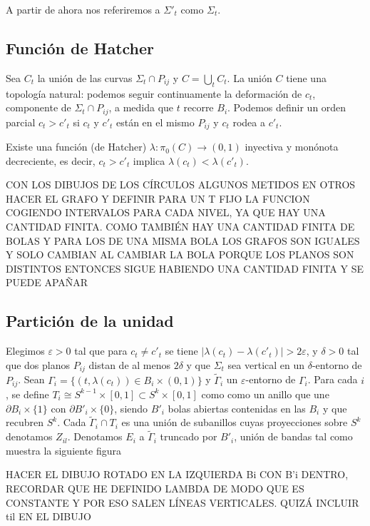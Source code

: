 \documentclass[twoside, 11pt]{article}
\begin{document}
A partir de ahora nos referiremos a $\Sigma'_t$ como $\Sigma_t$. 

\subsection{Función de Hatcher}
Sea $C_t$ la unión de las curvas $\Sigma_t\cap P_{ij}$ y $C=\bigcup_t C_t$. La unión $C$ tiene una topología natural: podemos seguir continuamente la deformación de $c_t$, componente de $\Sigma_t\cap P_{ij}$, a medida que $t$ recorre $B_i$. Podemos definir un orden parcial $c_t>c'_t$ si $c_t$ y $c'_t$ están en el mismo $P_{ij}$ y $c_t$ rodea a $c'_t$. 

\begin{prop}
Existe una función (de Hatcher) $\lambda:\pi_0(C)\to (0,1)$ inyectiva y monónota decreciente, es decir, $c_t>c'_t$ implica $\lambda(c_t)<\lambda(c'_t)$.
\end{prop}
\begin{dem}
CON LOS DIBUJOS DE LOS CÍRCULOS ALGUNOS METIDOS EN OTROS HACER EL GRAFO Y DEFINIR PARA UN T FIJO LA FUNCION COGIENDO INTERVALOS PARA CADA NIVEL, YA QUE HAY UNA CANTIDAD FINITA. COMO TAMBIÉN HAY UNA CANTIDAD FINITA DE BOLAS Y PARA LOS DE UNA MISMA BOLA LOS GRAFOS SON IGUALES Y SOLO CAMBIAN AL CAMBIAR LA BOLA PORQUE LOS PLANOS SON DISTINTOS ENTONCES SIGUE HABIENDO UNA CANTIDAD FINITA Y SE PUEDE APAÑAR
\QED
\end{dem}
\subsection{Partición de la unidad}
Elegimos $\varepsilon>0$ tal que para $c_t\neq c'_t$ se tiene $|\lambda(c_t)-\lambda(c'_t)|>2\varepsilon$, y $\delta>0$ tal que dos planos $P_{ij}$ distan de al menos $2\delta$ y que $\Sigma_t$ sea vertical en un $\delta$-entorno de $P_{ij}$. Sean $\Gamma_i=\{(t,\lambda(c_t))\in B_i\times (0,1)\}$ y $\widetilde{\Gamma}_i$ un $\varepsilon$-entorno de $\Gamma_i$. Para cada $i$, se define $T_i\cong S^{k-1}\times[0,1]\subset S^k\times[0,1]$ como como un anillo que une $\partial B_i\times\{1\}$ con $\partial B'_i\times\{0\}$, siendo $B'_i$ bolas abiertas contenidas en las $B_i$ y que recubren $S^k$. Cada $\widetilde{\Gamma}_i\cap T_i$ es una unión de subanillos cuyas proyecciones sobre $S^k$ denotamos $Z_{il}$. Denotamos $E_i$ a $\widetilde{\Gamma}_i$ truncado por $B'_i$, unión de bandas tal como muestra la siguiente figura

HACER EL DIBUJO ROTADO EN LA IZQUIERDA Bi CON B'i DENTRO, RECORDAR QUE HE DEFINIDO LAMBDA DE MODO QUE ES CONSTANTE Y POR ESO SALEN LÍNEAS VERTICALES. QUIZÁ INCLUIR til EN EL DIBUJO
\end{document}
